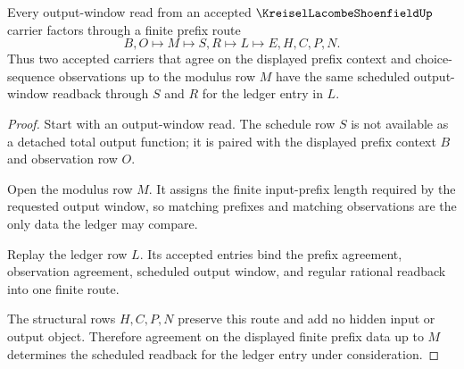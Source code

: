\begin{theorem}\label{thm:kreisel-lacombe-shoenfield-prefix-continuity}
Every output-window read from an accepted $\KreiselLacombeShoenfieldUp$ carrier factors through a finite prefix route
$$
B,O \longmapsto M \longmapsto S,R \longmapsto L \longmapsto E,H,C,P,N .
$$
Thus two accepted carriers that agree on the displayed prefix context and choice-sequence observations up to the modulus row $M$ have the same scheduled output-window readback through $S$ and $R$ for the ledger entry in $L$.
\end{theorem}
\begin{proof}
Start with an output-window read. The schedule row $S$ is not available as a detached total output function; it is paired with the displayed prefix context $B$ and observation row $O$.

Open the modulus row $M$. It assigns the finite input-prefix length required by the requested output window, so matching prefixes and matching observations are the only data the ledger may compare.

Replay the ledger row $L$. Its accepted entries bind the prefix agreement, observation agreement, scheduled output window, and regular rational readback into one finite route.

The structural rows $H,C,P,N$ preserve this route and add no hidden input or output object. Therefore agreement on the displayed finite prefix data up to $M$ determines the scheduled readback for the ledger entry under consideration.
\end{proof}

